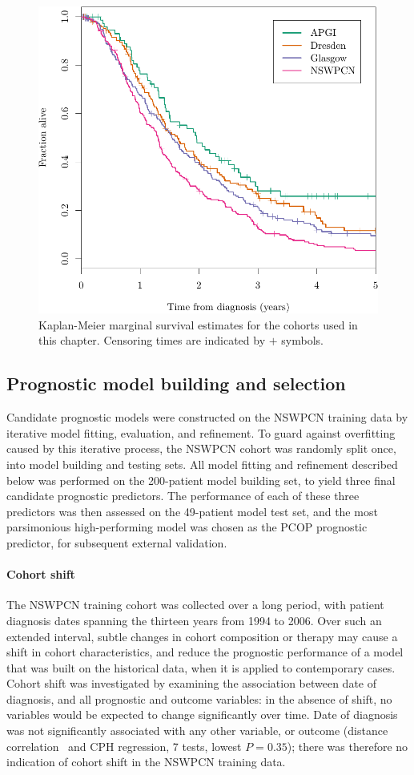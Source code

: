 \documentclass[dissertation.tex]{subfiles}
\begin{document}
\begin{figure}
\centering
  \includegraphics[width=.7\textwidth]{analysis/nomogram/figure/07-cohort-surv-comparison-1}
\caption[Cohort marginal survival estimates]{Kaplan-Meier marginal survival estimates for the cohorts used in this chapter.  Censoring times are indicated by $+$ symbols.}
\label{fig:nomo-cohort-km}
\end{figure}

\subsection{Prognostic model building and selection}
Candidate prognostic models were constructed on the \gls{NSWPCN} training data by iterative model fitting, evaluation, and refinement.  To guard against overfitting caused by this iterative process, the \gls{NSWPCN} cohort was randomly split once, into model building and testing sets.  All model fitting and refinement described below was performed on the 200-patient model building set, to yield three final candidate prognostic predictors.  The performance of each of these three predictors was then assessed on the 49-patient model test set, and the most parsimonious high-performing model was chosen as the \gls{PCOP} prognostic predictor, for subsequent external validation.

\paragraph{Cohort shift}
The \gls{NSWPCN} training cohort was collected over a long period, with patient diagnosis dates spanning the thirteen years from 1994 to 2006.  Over such an extended interval, subtle changes in cohort composition or therapy may cause a shift in cohort characteristics, and reduce the prognostic performance of a model that was built on the historical data, when it is applied to contemporary cases.  Cohort shift was investigated by examining the association between date of diagnosis, and all prognostic and outcome variables: in the absence of shift, no variables would be expected to change significantly over time.  Date of diagnosis was not significantly associated with any other variable, or outcome (distance correlation~\cite{Szekely2013} and \gls{CPH} regression, 7 tests, lowest $P = 0.35$); there was therefore no indication of cohort shift in the \gls{NSWPCN} training data.
\end{document}
